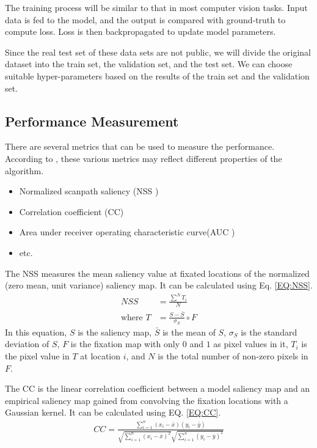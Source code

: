 \documentclass[12pt]{article}
\begin{document}
The training process will be similar to that in most computer vision tasks. Input data is fed to the model,
and the output is compared with ground-truth to compute loss. Loss is then backpropagated to update model parameters.

Since the real test set of these data sets are not public, we will divide the original dataset into the train set, the validation set, and the test set. We can choose suitable hyper-parameters based on the results of the train set and the validation set.

\subsection{Performance Measurement}

There are several metrics that can be used to measure the performance. According to \cite{riche2013saliency}, these various metrics may reflect different properties of the algorithm.
\begin{itemize}
    \item Normalized scanpath saliency (NSS \cite{petersComponentsBottomupGaze2005})
    \item Correlation coefficient (CC)
    \item Area under receiver operating characteristic curve(AUC \cite{richeSaliencyHumanFixations2013})
    \item etc.
\end{itemize}

The NSS measures the mean saliency value at fixated locations of the normalized (zero mean, unit variance) saliency map. 
It can be calculated using Eq. \ref{EQ:NSS}. 
\begin{equation}
    \begin{aligned}
        NSS &= \frac{\sum^{N} T_{i}}{N}\\
        \text{where }T &= \frac{S - \bar{S}}{\sigma_{S}} \circ F
    \end{aligned}
    \label{EQ:NSS}
\end{equation}
In this equation, $S$ is the saliency map, $\bar{S}$ is the mean of $S$, $\sigma_{S}$ is 
the standard deviation of $S$, $F$ is the fixation map with only $0$ and $1$ as pixel values in it,
$T_{i}$ is the pixel value in $T$ at location $i$, and $N$ is the total number of non-zero pixels in $F$.

The CC is the linear correlation coefficient between a model saliency map and an empirical saliency map 
gained from convolving the fixation locations with a Gaussian kernel. It can be calculated using EQ. \ref{EQ:CC}. 
\begin{equation}
    \begin{aligned}
        CC = \frac{\sum_{i=1}^{n}(x_{i}-\bar{x})(y_{i}-\bar{y})}
        {\sqrt{\sum_{i=1}^{n}(x_{i}-\bar{x})^{2}}\sqrt{\sum_{i=1}^{n}(y_{i}-\bar{y})^{2}}}
    \end{aligned}
    \label{EQ:CC}
\end{equation}
\end{document}

